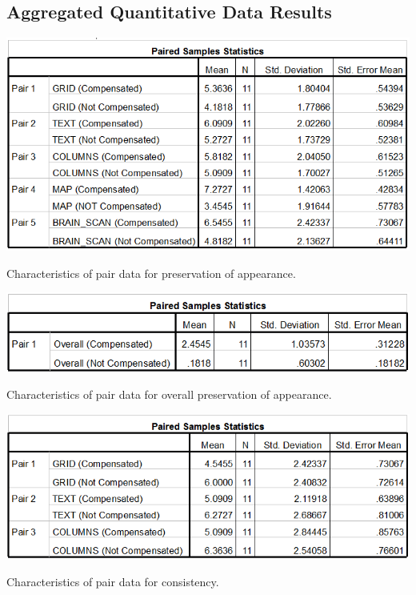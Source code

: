 \documentclass[]{article}
\begin{document}
\begin{appendices}
\subsection{Aggregated Quantitative Data Results}
\label{appendix:B-agg}
\begin{table}[!h]
  \includegraphics[width=\linewidth]{figures/results/POA_Pairs.PNG}
  \caption{Characteristics of pair data for preservation of appearance.}
  \label{tabel:POA_Pairs}
\end{table}

\begin{table}[!h]
  \includegraphics[width=\linewidth]{figures/results/OPOA_Pairs.PNG}
  \caption{Characteristics of pair data for overall preservation of appearance.}
  \label{tabel:OPOA_Pairs}
\end{table}

\begin{table}[!h]
  \includegraphics[width=\linewidth]{figures/results/Consistency_Pairs.PNG}
  \caption{Characteristics of pair data for consistency.}
  \label{tabel:Consistency_Pairs}
\end{table}


\end{appendices}
\end{document}
